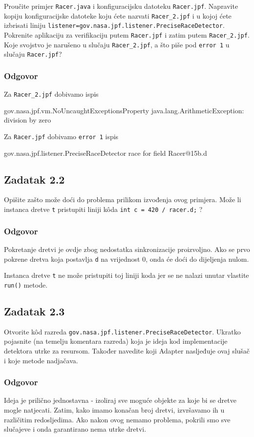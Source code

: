 \documentclass{article}
\newcommand{\zadatak}[1]{\subsection{Zadatak #1}}
\newcommand{\odgovor}{\subsubsection*{Odgovor}}
\newcommand{\code}[1]{\colorbox{blue!11}{\texttt{#1}}}
\begin{document}
Proučite primjer \texttt{Racer.java} i konfiguracijsku datoteku \texttt{Racer.jpf}. Napravite kopiju konfiguracijske datoteke koju ćete nazvati \texttt{Racer\_2.jpf} i u kojoj ćete izbrisati liniju \code{listener=gov.nasa.jpf.listener.PreciseRaceDetector}. Pokrenite aplikaciju za verifikaciju putem \texttt{Racer.jpf} i zatim putem \texttt{Racer\_2.jpf}. Koje svojstvo je narušeno u slučaju \texttt{Racer\_2.jpf}, a što piše pod \texttt{error 1} u slučaju \texttt{Racer.jpf}?

\odgovor

Za \texttt{Racer\_2.jpf} dobivamo ispis

\begin{ccode}
gov.nasa.jpf.vm.NoUncaughtExceptionsProperty
java.lang.ArithmeticException: division by zero
\end{ccode}

\noindent
Za \texttt{Racer.jpf} dobivamo \texttt{error 1} ispis

\begin{ccode}
gov.nasa.jpf.listener.PreciseRaceDetector
race for field Racer@15b.d
\end{ccode}

\zadatak{2.2}

Opišite zašto može doći do problema prilikom izvođenja ovog primjera. Može li instanca dretve \texttt{t} pristupiti liniji kôda \code{int c = 420 / racer.d;} ?

\odgovor

Pokretanje dretvi je ovdje zbog nedostatka sinkronizacije proizvoljno. Ako se prvo pokrene dretva koja postavlja \texttt{d} na vrijednost 0, onda će doći do dijeljenja nulom.\newline

\noindent
Instanca dretve \texttt{t} ne može pristupiti toj liniji koda jer se ne nalazi unutar vlastite \code{run()} metode.

\pagebreak  %

\zadatak{2.3}

Otvorite kôd razreda \texttt{gov.nasa.jpf.listener.PreciseRaceDetector}. Ukratko pojasnite (na temelju komentara razreda) koja je ideja kod implementacije detektora utrke za resursom. Također navedite koji Adapter nasljeđuje ovaj slušač i koje metode nadjačava.

\odgovor

Ideja je prilično jednostavna - izoliraj sve moguće objekte za koje bi se dretve mogle natjecati. Zatim, kako imamo konačan broj dretvi, izvršavamo ih u različitim redosljedima. Ako nakon ovog nemamo problema, pokrili smo sve slučajeve i onda garantirano nema utrke dretvi.\newline
\end{document}
